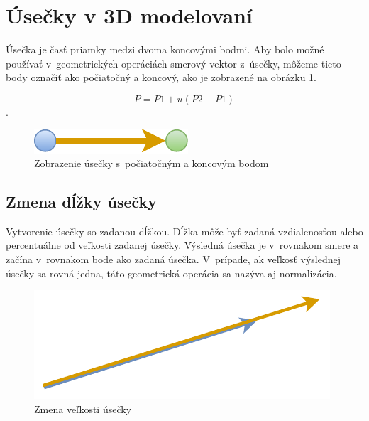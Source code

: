 \section{Úsečky v 3D modelovaní}
Úsečka je časť priamky medzi dvoma koncovými bodmi. Aby bolo možné používať v~geometrických operáciách smerový vektor z~úsečky, môžeme tieto body označiť ako počiatočný a koncový, ako je zobrazené na obrázku \ref{fig:Navrh operacii-1D - Line}. 

\begin{equation}
    P = P1 + u(P2-P1)
    \label{eq:priamka}
\end{equation}. 

\begin{figure}[H]
	\centering
	\includegraphics[]{obrazky-figures/Diagram/Draw/2Line/DP Navrh operacii-1D - Line.pdf}
	\caption{Zobrazenie úsečky s~počiatočným a koncovým bodom}
	\label{fig:Navrh operacii-1D - Line}
\end{figure}


\subsection*{Zmena dĺžky úsečky}
Vytvorenie úsečky so zadanou dĺžkou. Dĺžka môže byť zadaná vzdialenosťou alebo percentuálne od veľkosti zadanej úsečky. Výsledná úsečka je v~rovnakom smere a začína v~rovnakom bode ako zadaná úsečka. V~prípade, ak veľkosť výslednej úsečky sa rovná jedna, táto geometrická operácia sa nazýva aj normalizácia.  


\begin{figure}[H]
	\centering
	\includegraphics[]{obrazky-figures/Diagram/Draw/2Line/DP Navrh operacii-1D - LineChangeLength.pdf}
	\caption{Zmena veľkosti úsečky}
	\label{fig:LineChangeLength}
\end{figure}

